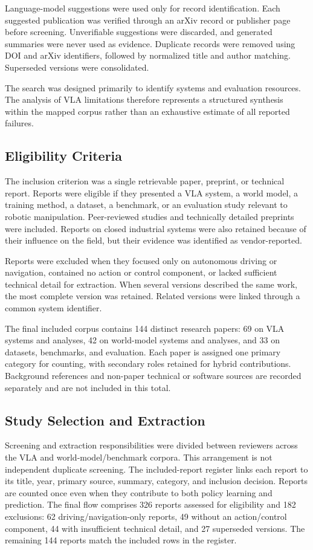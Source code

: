 \documentclass{ieeeaccess}
\begin{document}
Language-model suggestions were used only for record identification. Each suggested publication was verified through an arXiv record or publisher page before screening. Unverifiable suggestions were discarded, and generated summaries were never used as evidence. Duplicate records were removed using DOI and arXiv identifiers, followed by normalized title and author matching. Superseded versions were consolidated.

The search was designed primarily to identify systems and evaluation resources. The analysis of VLA limitations therefore represents a structured synthesis within the mapped corpus rather than an exhaustive estimate of all reported failures.

\subsection{Eligibility Criteria}
\label{sec:eligibility}

The inclusion criterion was a single retrievable paper, preprint, or technical report. Reports were eligible if they presented a VLA system, a world model, a training method, a dataset, a benchmark, or an evaluation study relevant to robotic manipulation. Peer-reviewed studies and technically detailed preprints were included. Reports on closed industrial systems were also retained because of their influence on the field, but their evidence was identified as vendor-reported.

Reports were excluded when they focused only on autonomous driving or navigation, contained no action or control component, or lacked sufficient technical detail for extraction. When several versions described the same work, the most complete version was retained. Related versions were linked through a common system identifier.

\textcolor[RGB]{104,48,148}{The final included corpus contains 144 distinct research papers: 69 on VLA systems and analyses, 42 on world-model systems and analyses, and 33 on datasets, benchmarks, and evaluation. Each paper is assigned one primary category for counting, with secondary roles retained for hybrid contributions. Background references and non-paper technical or software sources are recorded separately and are not included in this total.}

\subsection{Study Selection and Extraction}
\label{sec:selection-extraction}
\textcolor[RGB]{104,48,148}{Screening and extraction responsibilities were divided between reviewers across the VLA and world-model/benchmark corpora. This arrangement is not independent duplicate screening. The included-report register links each report to its title, year, primary source, summary, category, and inclusion decision. Reports are counted once even when they contribute to both policy learning and prediction. The final flow comprises 326 reports assessed for eligibility and 182 exclusions: 62 driving/navigation-only reports, 49 without an action/control component, 44 with insufficient technical detail, and 27 superseded versions. The remaining 144 reports match the included rows in the register.}
\end{document}
